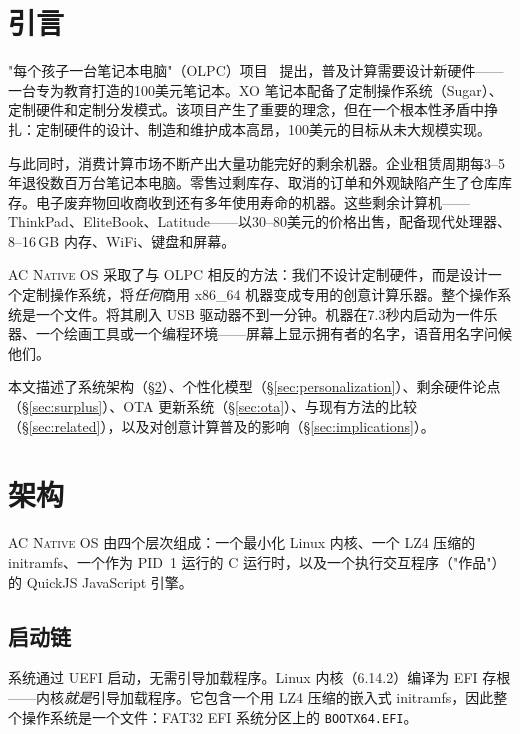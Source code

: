 \documentclass[10pt,letterpaper,twocolumn]{article}
\newcommand{\acos}{\textsc{AC Native OS}}
\begin{document}

\section{引言}

"每个孩子一台笔记本电脑"（OLPC）项目~\citep{negroponte1995being, kraemer2009olpc} 提出，普及计算需要设计新硬件——一台专为教育打造的100美元笔记本。XO 笔记本配备了定制操作系统（Sugar）、定制硬件和定制分发模式。该项目产生了重要的理念，但在一个根本性矛盾中挣扎：定制硬件的设计、制造和维护成本高昂，100美元的目标从未大规模实现。

与此同时，消费计算市场不断产出大量功能完好的剩余机器。企业租赁周期每3--5年退役数百万台笔记本电脑。零售过剩库存、取消的订单和外观缺陷产生了仓库库存。电子废弃物回收商收到还有多年使用寿命的机器。这些剩余计算机——ThinkPad、EliteBook、Latitude——以30--80美元的价格出售，配备现代处理器、8--16\,GB 内存、WiFi、键盘和屏幕。

\acos{} 采取了与 OLPC 相反的方法：我们不设计定制硬件，而是设计一个定制操作系统，将\emph{任何}商用 x86\_64 机器变成专用的创意计算乐器。整个操作系统是一个文件。将其刷入 USB 驱动器不到一分钟。机器在7.3秒内启动为一件乐器、一个绘画工具或一个编程环境——屏幕上显示拥有者的名字，语音用名字问候他们。

本文描述了系统架构（\S\ref{sec:architecture}）、个性化模型（\S\ref{sec:personalization}）、剩余硬件论点（\S\ref{sec:surplus}）、OTA 更新系统（\S\ref{sec:ota}）、与现有方法的比较（\S\ref{sec:related}），以及对创意计算普及的影响（\S\ref{sec:implications}）。


\section{架构}
\label{sec:architecture}

\acos{} 由四个层次组成：一个最小化 Linux 内核、一个 LZ4 压缩的 initramfs、一个作为 PID~1 运行的 C 运行时，以及一个执行交互程序（"作品"）的 QuickJS JavaScript 引擎。

\subsection{启动链}

系统通过 UEFI 启动，无需引导加载程序。Linux 内核（6.14.2）编译为 EFI 存根——内核\emph{就是}引导加载程序。它包含一个用 LZ4 压缩的嵌入式 initramfs，因此整个操作系统是一个文件：FAT32 EFI 系统分区上的 \texttt{BOOTX64.EFI}。
\end{document}
